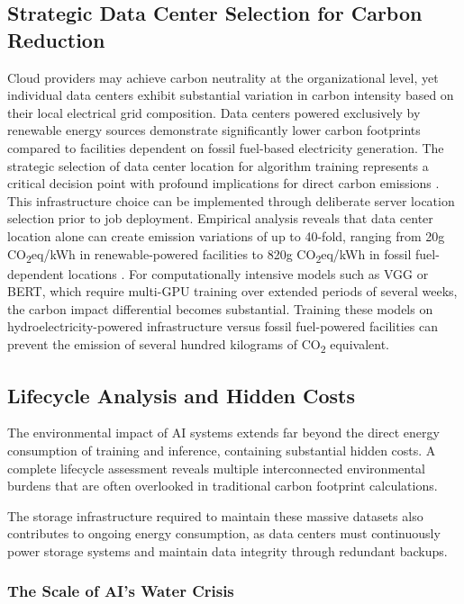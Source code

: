 \documentclass[twoside]{ai_ethics_class}
\begin{document}
\subsection{Strategic Data Center Selection for Carbon Reduction}
Cloud providers may achieve carbon neutrality at the organizational level, yet individual data centers exhibit substantial variation in carbon intensity based on their local electrical grid composition.
Data centers powered exclusively by renewable energy sources demonstrate significantly lower carbon footprints compared to facilities dependent on fossil fuel-based electricity generation.
The strategic selection of data center location for algorithm training represents a critical decision point with profound implications for direct carbon emissions \cite{lacoste2019quantifying}.
This infrastructure choice can be implemented through deliberate server location selection prior to job deployment.
Empirical analysis reveals that data center location alone can create emission variations of up to 40-fold, ranging from 20g CO\textsubscript{2}eq/kWh in renewable-powered facilities to 820g CO\textsubscript{2}eq/kWh in fossil fuel-dependent locations \cite{lacoste2019quantifying}.
For computationally intensive models such as VGG or BERT, which require multi-GPU training over extended periods of several weeks, the carbon impact differential becomes substantial.
Training these models on hydroelectricity-powered infrastructure versus fossil fuel-powered facilities can prevent the emission of several hundred kilograms of CO\textsubscript{2} equivalent.

\subsection{Lifecycle Analysis and Hidden Costs}

The environmental impact of AI systems extends far beyond the direct energy consumption of training and inference, containing substantial hidden costs.
A complete lifecycle assessment reveals multiple interconnected environmental burdens that are often overlooked in traditional carbon footprint calculations.

The storage infrastructure required to maintain these massive datasets also contributes to ongoing energy consumption, as data centers must continuously power storage systems and maintain data integrity through redundant backups.

\subsubsection{The Scale of AI's Water Crisis}
\end{document}
